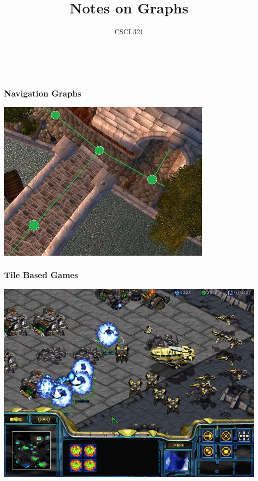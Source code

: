 \documentclass[handout,t,compress]{beamer}
\title{Notes on Graphs}
\author{CSCI 321}
\institute{WWU}
\newcommand{\bframe}[1]{\begin{frame}[fragile]\frametitle{{#1}}}
\begin{document}
\small
{}

\bframe{~}
\titlepage
\end{frame}

\bframe{Navigation Graphs}
\includegraphics[width=\textwidth]{Stormwind_waypoints.jpg}
\end{frame}

\bframe{Tile Based Games}
\includegraphics[width=\textwidth]{starcraft.jpg}
\end{frame}
\end{document}
